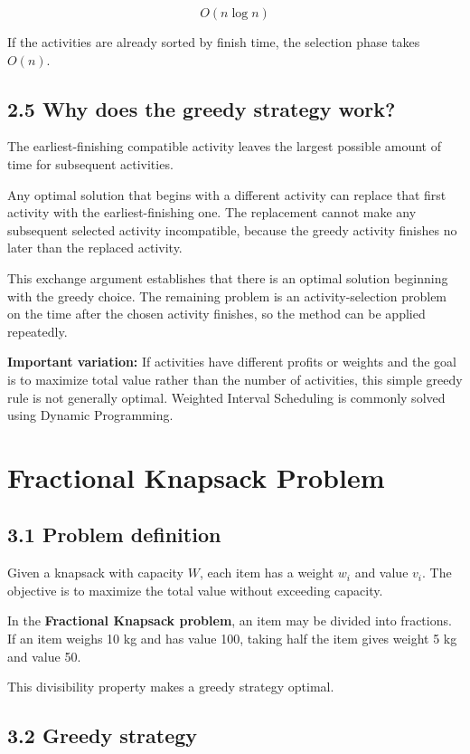 \[
\boxed{O(n\log n)}
\]


If the activities are already sorted by finish time, the selection phase takes $O(n)$.

\subsection{2.5 Why does the greedy strategy work?}

The earliest-finishing compatible activity leaves the largest possible amount of time for subsequent activities.

Any optimal solution that begins with a different activity can replace that first activity with the earliest-finishing one. The replacement cannot make any subsequent selected activity incompatible, because the greedy activity finishes no later than the replaced activity.

This exchange argument establishes that there is an optimal solution beginning with the greedy choice. The remaining problem is an activity-selection problem on the time after the chosen activity finishes, so the method can be applied repeatedly.

\textbf{Important variation:} If activities have different profits or weights and the goal is to maximize total value rather than the number of activities, this simple greedy rule is not generally optimal. Weighted Interval Scheduling is commonly solved using Dynamic Programming.

\section{Fractional Knapsack Problem}

\subsection{3.1 Problem definition}

Given a knapsack with capacity $W$, each item has a weight $w_i$ and value $v_i$. The objective is to maximize the total value without exceeding capacity.

In the \textbf{Fractional Knapsack problem}, an item may be divided into fractions. If an item weighs 10 kg and has value 100, taking half the item gives weight 5 kg and value 50.

This divisibility property makes a greedy strategy optimal.

\subsection{3.2 Greedy strategy}

